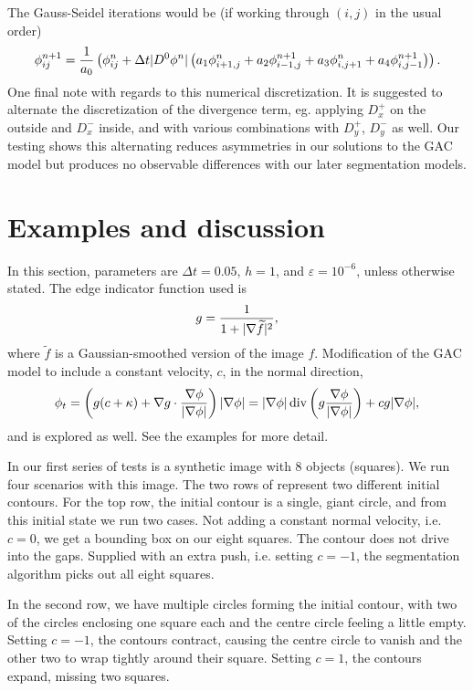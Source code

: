 The Gauss-Seidel iterations would be (if working through $(i,j)$ in the usual order)
\begin{align*}
\phi^{n+1}_{ij} 
= \frac{1}{a_0} 
\left( \phi^n_{ij} + \Delta t \lvert D^0 \phi^n\rvert
\left( a_1 \phi^n_{i+1,j} + a_2 \phi^{n+1}_{i-1,j} + a_3 \phi^{n}_{i,j+1} + a_4 \phi^{n+1}_{i,j-1}
\right)
\right).
\end{align*}
One final note with regards to this numerical discretization. It is suggested to alternate the discretization of the divergence term, eg. applying $D^+_x$ on the outside and $D^-_x$ inside, and with various combinations with $D^+_y$, $D^-_y$ as well. Our testing shows this alternating reduces asymmetries in our solutions to the GAC model but produces no observable differences with our later segmentation models.


\section{Examples and discussion} 
In this section, parameters are $\Delta t = 0.05$, $h = 1$, and $\varepsilon = 10^{-6}$, unless otherwise stated.
The edge indicator function used is 
\begin{align}
g = \frac{1}{1 + \lvert\nabla \widetilde f\rvert^2 },
\label{eq:edge_indicator}
\end{align}
where $\widetilde f$ is a Gaussian-smoothed version of the image $f$. Modification of the GAC model to include a constant velocity, $c$, in the normal direction, 
\begin{align}
\phi_t 
= \left( g ( c + \kappa) + \nabla g \cdot \frac{\nabla \phi}{\lvert\nabla \phi\rvert} \right) \lvert\nabla \phi\rvert
= 
\lvert\nabla \phi\rvert \operatorname{div}\left( g \frac{\nabla \phi}{\lvert\nabla \phi\rvert} \right) 
+ cg \lvert\nabla \phi\rvert,
\label{eq:gac+c}
\end{align}
and is explored as well. See the examples for more detail.


In our first series of tests is a synthetic image with 8 objects (squares). We run four scenarios with this image. The two rows of  represent two different initial contours. For the top row, the initial contour is a single, giant circle, and from this initial state we run two cases.  Not adding a constant normal velocity, i.e. $c = 0$, we get a bounding box on our eight squares. The contour does not drive into the gaps. Supplied with an extra push, i.e. setting $c = -1$, the segmentation algorithm picks out all eight squares.
	
In the second row, we have multiple circles forming the initial contour, with two of the circles enclosing one square each and the centre circle feeling a little empty. Setting $c = -1$, the contours contract, causing the centre circle to vanish and the other two to wrap tightly around their square. Setting $c = 1$, the contours expand, missing two squares.
	
